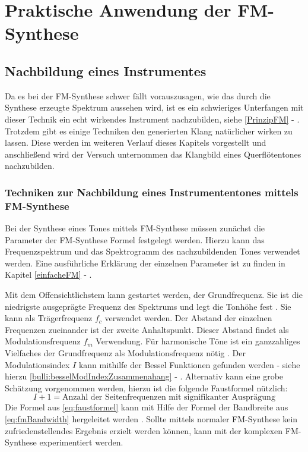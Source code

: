 \section{Praktische Anwendung der FM-Synthese}
\FloatBarrier
\subsection{Nachbildung eines Instrumentes}
Da es bei der FM-Synthese schwer fällt vorauszusagen, wie das durch die Synthese erzeugte Spektrum aussehen wird, ist es ein schwieriges Unterfangen mit dieser Technik ein echt wirkendes Instrument nachzubilden, siehe \ref{PrinzipFM} - .
Trotzdem gibt es einige Techniken den generierten Klang natürlicher wirken zu lassen. Diese werden im weiteren Verlauf dieses Kapitels vorgestellt und anschließend wird der Versuch unternommen das Klangbild eines Querflötentones nachzubilden.

\FloatBarrier
\subsubsection{Techniken zur Nachbildung eines Instrumententones mittels FM-Synthese}

Bei der Synthese eines Tones mittels FM-Synthese müssen zunächst die Parameter der FM-Synthese Formel festgelegt werden. Hierzu kann das Frequenzspektrum und das Spektrogramm des nachzubildenden Tones verwendet werden. Eine ausführliche Erklärung der einzelnen Parameter ist zu finden in Kapitel \ref{einfacheFM} - . 

Mit dem Offensichtlichstem kann gestartet werden, der Grundfrequenz. Sie ist die niedrigste ausgeprägte Frequenz des Spektrums und legt die Tonhöhe fest \cite[S. 53]{barkowsky}. Sie kann als Trägerfrequenz $f_c$ verwendet werden. Der Abstand der einzelnen Frequenzen zueinander ist der zweite Anhaltspunkt. Dieser Abstand findet als Modulationsfrequenz $f_m$ Verwendung. Für harmonische Töne ist ein ganzzahliges Vielfaches der Grundfrequenz als Modulationsfrequenz nötig \cite[S. 528]{chowningPaper}. Der Modulationsindex $I$ kann mithilfe der Bessel Funktionen gefunden werden - siehe hierzu \ref{bulli:besselModIndexZusammenahang} - . Alternativ kann eine grobe Schätzung vorgenommen werden, hierzu ist die folgende Faustformel nützlich:
\begin{equation}
\label{eq:faustformel}
I + 1 = \text{Anzahl der Seitenfrequenzen mit signifikanter Ausprägung}
\end{equation}
Die Formel aus \ref{eq:faustformel} kann mit Hilfe der Formel der Bandbreite aus \ref{eq:fmBandwidth} hergeleitet werden \cite[S. 221]{lathi}. Sollte mittels normaler FM-Synthese kein zufriedenstellendes Ergebnis erzielt werden können, kann mit der komplexen FM-Synthese experimentiert werden. 

